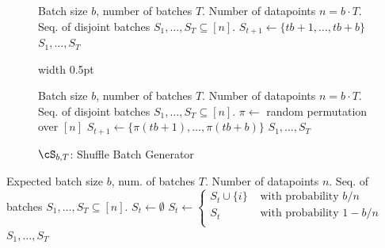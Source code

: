 \documentclass[twoside]{article}
\newcommand{\PARAMETERS}{\STATE \hspace{-3.5mm}{\bf Params:}\xspace}
\theoremstyle{definition}
\begin{document}
{
\newcommand{\algtextfont}{\fontsize{8.5pt}{10pt}\selectfont}
\newcommand{\highlight}[1]{\colorbox{blue!10}{\textcolor{black}{#1}}}

\begin{figure}[H]
\begin{minipage}[H]{0.48\textwidth}
\begin{algorithm}[H]
\caption{$\cD_{b,T}$: Deterministic Batch Generator}
\label{alg:deterministic-batch}
\begin{algorithmic}
\PARAMETERS Batch size $b$, number of batches $T$.
\REQUIRE Number of datapoints $n = b \cdot T$.
\ENSURE Seq. of disjoint batches $S_1, \ldots, S_T \subseteq [n]$.
    \STATE $S_{t+1} \gets \{tb + 1, \ldots, tb + b\}$
\ENDFOR
\RETURN $S_1, \ldots, S_T$
\end{algorithmic}
\end{algorithm}
\end{minipage}
\hspace*{3pt}
{\vrule width 0.5pt}
\hspace*{3pt}
\begin{minipage}[H]{0.48\textwidth}
\begin{algorithm}[H]
\caption{$\cS_{b,T}$: Shuffle Batch Generator}
\label{alg:shuffle-batch}
\begin{algorithmic}
\PARAMETERS Batch size $b$, number of batches $T$.
\REQUIRE Number of datapoints $n = b \cdot T$.
\ENSURE Seq. of disjoint batches $S_1, \ldots, S_T \subseteq [n]$.
\STATE $\pi \gets$ random permutation over $[n]$
    \STATE $S_{t+1} \gets \{\pi(tb + 1), \ldots, \pi(tb + b)\}$
\ENDFOR
\RETURN $S_1, \ldots, S_T$
\end{algorithmic}
\end{algorithm}
\end{minipage}
\vspace*{-1mm}
\end{figure}

\begin{algorithm}[H]
\caption{$\cP_{b,T}$: Poisson Batch Generator}
\label{alg:poisson-batch}
\begin{algorithmic}
\PARAMETERS Expected batch size $b$, num. of batches $T$.
\REQUIRE Number of datapoints $n$.
\ENSURE Seq. of batches $S_1, \ldots, S_T \subseteq [n]$.
    \STATE $S_{t} \gets \emptyset$
        \STATE $S_{t} \gets \begin{cases}
            S_{t} \cup \{i\} & \text{ with probability } b/n\\
            S_{t} & \text{ with probability } 1 - b/n\\
        \end{cases}$
    \ENDFOR
\ENDFOR
\RETURN $S_1, \ldots, S_T$
\end{algorithmic}
\end{algorithm}

}
\end{document}

